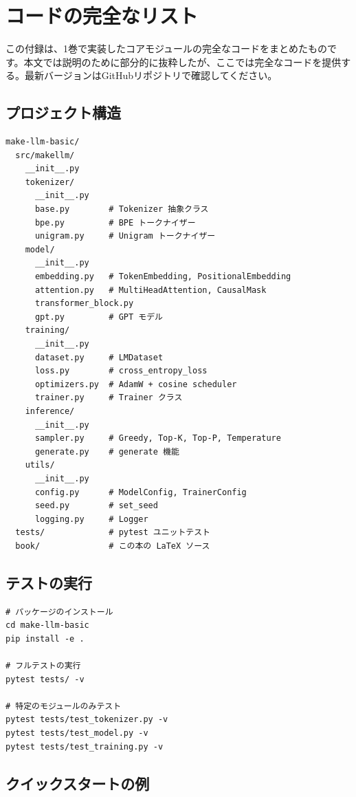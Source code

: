 \chapter{コードの完全なリスト}
\label{app:code}

この付録は、1巻で実装したコアモジュールの完全なコードをまとめたものです。本文では説明のために部分的に抜粋したが、ここでは完全なコードを提供する。最新バージョンはGitHubリポジトリで確認してください。

\section{プロジェクト構造}

\begin{lstlisting}[style=bashstyle]
make-llm-basic/
  src/makellm/
    __init__.py
    tokenizer/
      __init__.py
      base.py        # Tokenizer 抽象クラス
      bpe.py         # BPE トークナイザー
      unigram.py     # Unigram トークナイザー
    model/
      __init__.py
      embedding.py   # TokenEmbedding, PositionalEmbedding
      attention.py   # MultiHeadAttention, CausalMask
      transformer_block.py
      gpt.py         # GPT モデル
    training/
      __init__.py
      dataset.py     # LMDataset
      loss.py        # cross_entropy_loss
      optimizers.py  # AdamW + cosine scheduler
      trainer.py     # Trainer クラス
    inference/
      __init__.py
      sampler.py     # Greedy, Top-K, Top-P, Temperature
      generate.py    # generate 機能
    utils/
      __init__.py
      config.py      # ModelConfig, TrainerConfig
      seed.py        # set_seed
      logging.py     # Logger
  tests/             # pytest ユニットテスト
  book/              # この本の LaTeX ソース
\end{lstlisting}

\section{テストの実行}

\begin{lstlisting}[style=bashstyle]
# パッケージのインストール
cd make-llm-basic
pip install -e .

# フルテストの実行
pytest tests/ -v

# 特定のモジュールのみテスト
pytest tests/test_tokenizer.py -v
pytest tests/test_model.py -v
pytest tests/test_training.py -v
\end{lstlisting}

\section{クイックスタートの例}

